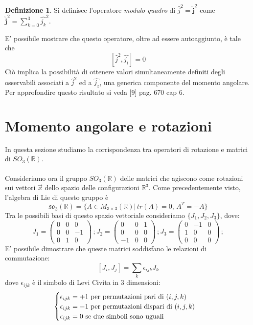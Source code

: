 \documentclass[12pt,a4paper]{report}
\theoremstyle{definition}
\newtheorem{Def}{Definizione}[chapter]
\theoremstyle{Theorem}
\theoremstyle{definition}
\theoremstyle{definition}
\theoremstyle{definition}
\begin{document}
\begin{Def}
	Si definisce l'operatore \textit{modulo quadro} di $\hat{j}^2=\hat{\textbf{j}}^2$ come $\hat{\textbf{j}}^2=\sum_{k=0}^{3}\hat{j_k}^2$.
\end{Def}
E' possibile mostrare che questo operatore, oltre ad essere autoaggiunto, è tale che
$$[\hat{j}^2,\hat{j_i}]=0$$
Ciò implica la possibilità di ottenere valori simultaneamente definiti degli osservabili associati a $\hat{j}^2$ ed a $\hat{j_z}$, una generica componente del momento angolare.
Per approfondire questo risultato si veda [9] pag. 670 cap 6.
\section{Momento angolare e rotazioni}
In questa sezione studiamo la corrispondenza tra operatori di rotazione e matrici di $SO_3(\mathbb{R})$.\\
\\
Consideriamo ora il gruppo $SO_3(\mathbb{R})$ delle matrici che agiscono come rotazioni sui vettori  $\vec{x}$ dello spazio delle configurazioni $\mathbb{R}^3$. Come precedentemente visto, l'algebra di Lie di questo gruppo è
$$\mathfrak{so_3}(\mathbb{R})=\{A\in M_{3\times 3}(\mathbb{R})|\, tr(A)=0,\, A^T=-A\}$$
Tra le possibili basi di questo spazio vettoriale consideriamo $\{J_1,J_2,J_3\}$, dove:
$$
J_1=
\begin{pmatrix}
	0 &0&0\\
	0 &0&-1\\
	0 &1&0
\end{pmatrix} \, ;
J_2=
\begin{pmatrix}
	0 &0&1\\
	0 &0&0\\
	-1 &0&0
\end{pmatrix} \, ;
J_3=
\begin{pmatrix}
	0 &-1&0\\
	1 &0&0\\
	0 &0&0
\end{pmatrix} \, ;
$$
E' possibile dimostrare che queste matrici soddisfano le relazioni di commutazione:
$$[J_i,J_j]=\sum_{k}\epsilon_{ijk}J_k$$
dove $\epsilon_{ijk}$ è il simbolo di Levi Civita in 3 dimensioni: 
\begin{equation}
	\begin{cases}
		\epsilon_{ijk}=+1$ per permutazioni pari di $(i,j,k)\\
		\epsilon_{ijk}=-1 $ per permutazioni dispari di $(i,j,k)\\
		\epsilon_{ijk}=0$ se due simboli sono uguali$
	\end{cases}
\end{equation}
\end{document}
